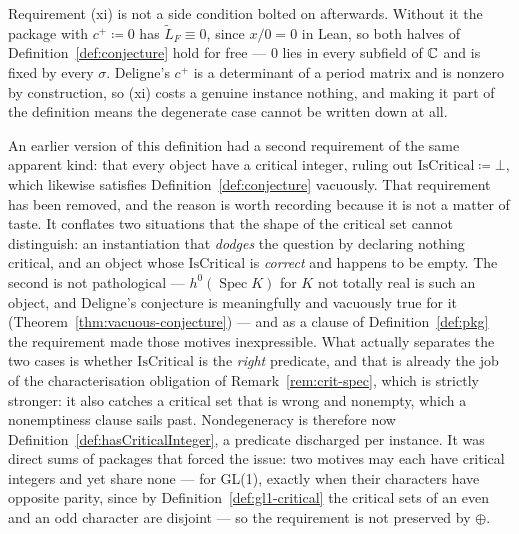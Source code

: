 \begin{remark}
  \label{rem:not-a-pkg}
  Requirement (xi) is not a side condition bolted on afterwards. Without it the package with
  $c^{+} \coloneqq 0$ has $\widetilde{L}_F \equiv 0$, since $x/0 = 0$ in Lean, so both halves
  of Definition~\ref{def:conjecture} hold for free --- $0$ lies in every subfield of $\mathbb{C}$ and
  is fixed by every $\sigma$. Deligne's $c^{+}$ is a determinant of a period matrix and is
  nonzero by construction, so (xi) costs a genuine instance nothing, and making it part of the
  definition means the degenerate case cannot be written down at all.

  An earlier version of this definition had a second requirement of the same apparent kind:
  that every object have a critical integer, ruling out $\mathrm{IsCritical} \coloneqq \bot$,
  which likewise satisfies Definition~\ref{def:conjecture} vacuously. That requirement has been
  removed, and the reason is worth recording because it is not a matter of taste. It conflates
  two situations that the shape of the critical set cannot distinguish: an instantiation that
  \emph{dodges} the question by declaring nothing critical, and an object whose
  $\mathrm{IsCritical}$ is \emph{correct} and happens to be empty. The second is not
  pathological --- $h^{0}(\operatorname{Spec} K)$ for $K$ not totally real is such an object,
  and Deligne's conjecture is meaningfully and vacuously true for it
  (Theorem~\ref{thm:vacuous-conjecture}) --- and as a clause of Definition~\ref{def:pkg} the
  requirement made those motives inexpressible. What actually separates the two cases is whether
  $\mathrm{IsCritical}$ is the \emph{right} predicate, and that is already the job of the
  characterisation obligation of Remark~\ref{rem:crit-spec}, which is strictly stronger: it also
  catches a critical set that is wrong and nonempty, which a nonemptiness clause sails past.
  Nondegeneracy is therefore now Definition~\ref{def:hasCriticalInteger}, a predicate discharged
  per instance. It was direct sums of packages that forced the issue: two motives may each have
  critical integers and yet share none --- for GL(1), exactly when their characters have opposite
  parity, since by Definition~\ref{def:gl1-critical} the critical sets of an even and an odd
  character are disjoint --- so the requirement is not preserved by $\oplus$.
\end{remark}

